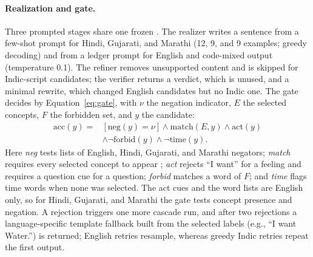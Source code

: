 \paragraph{Realization and gate.}
Three prompted stages share one frozen \qwen{}.
The realizer writes a sentence from a few-shot prompt for Hindi, Gujarati, and Marathi (12, 9, and 9 examples; greedy decoding) and from a ledger prompt for English and code-mixed output (temperature 0.1).
The refiner removes unsupported content and is skipped for Indic-script candidates; the verifier returns a verdict, which is unused, and a minimal rewrite, which changed English candidates but no Indic one.
The gate decides by Equation~\eqref{eq:gate}, with $\nu$ the negation indicator, $E$ the selected concepts, $F$ the forbidden set, and $y$ the candidate:
\begin{equation}
\begin{split}
\mathrm{acc}(y)={}&[\mathrm{neg}(y)=\nu]\wedge\mathrm{match}(E,y)\wedge\mathrm{act}(y)\\
&\wedge\neg\mathrm{forbid}(y)\wedge\neg\mathrm{time}(y).
\end{split}
\label{eq:gate}
\end{equation}
Here \emph{neg} tests lists of English, Hindi, Gujarati, and Marathi negators; \emph{match} requires every selected concept to appear ; \emph{act} rejects ``I want'' for a feeling and requires a question cue for a question; \emph{forbid} matches a word of $F$; and \emph{time} flags time words when none was selected.
The act cues and the word lists are English only, so for Hindi, Gujarati, and Marathi the gate tests concept presence and negation.
A rejection triggers one more cascade run, and after two rejections a language-specific template fallback built from the selected labels (e.g., ``I want Water.'') is returned; English retries resample, whereas greedy Indic retries repeat the first output.

